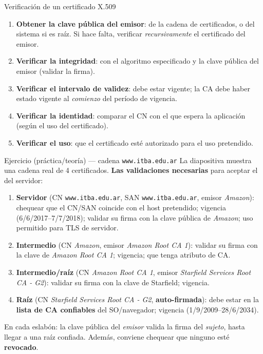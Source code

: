 \documentclass[11pt,a4paper]{article}
\begin{document}
\begin{defbox}{Verificación de un certificado X.509}
\begin{enumerate}[leftmargin=1.6em,itemsep=1pt]
  \item \textbf{Obtener la clave pública del emisor}: de la cadena de certificados, o del
        sistema si es raíz. Si hace falta, verificar \emph{recursivamente} el certificado del
        emisor.
  \item \textbf{Verificar la integridad}: con el algoritmo especificado y la clave pública del
        emisor (validar la firma).
  \item \textbf{Verificar el intervalo de validez}: debe estar vigente; la CA debe haber
        estado vigente al \emph{comienzo} del período de vigencia.
  \item \textbf{Verificar la identidad}: comparar el CN con el que espera la aplicación (según
        el uso del certificado).
  \item \textbf{Verificar el uso}: que el certificado esté autorizado para el uso pretendido.
\end{enumerate}
\end{defbox}

\begin{practbox}{Ejercicio (práctica/teoría) — cadena \texttt{www.itba.edu.ar}}
La diapositiva muestra una cadena real de 4 certificados. \textbf{Las validaciones necesarias}
para aceptar el del servidor:
\begin{enumerate}[leftmargin=1.6em,itemsep=1pt]
  \item \textbf{Servidor} (CN \texttt{www.itba.edu.ar}, SAN \texttt{www.itba.edu.ar}, emisor
        \emph{Amazon}): chequear que el CN/SAN coincide con el host pretendido; vigencia
        (6/6/2017–7/7/2018); validar su firma con la clave pública de \emph{Amazon}; uso
        permitido para TLS de servidor.
  \item \textbf{Intermedio} (CN \emph{Amazon}, emisor \emph{Amazon Root CA 1}): validar su
        firma con la clave de \emph{Amazon Root CA 1}; vigencia; que tenga atributo de CA.
  \item \textbf{Intermedio/raíz} (CN \emph{Amazon Root CA 1}, emisor \emph{Starfield Services
        Root CA - G2}): validar su firma con la clave de Starfield; vigencia.
  \item \textbf{Raíz} (CN \emph{Starfield Services Root CA - G2}, \textbf{auto-firmada}): debe
        estar en la \textbf{lista de CA confiables} del SO/navegador; vigencia (1/9/2009–28/6/2034).
\end{enumerate}
En cada eslabón: la clave pública del \emph{emisor} valida la firma del \emph{sujeto}, hasta
llegar a una raíz confiada. Además, conviene chequear que ninguno esté \textbf{revocado}.
\end{practbox}
\end{document}
